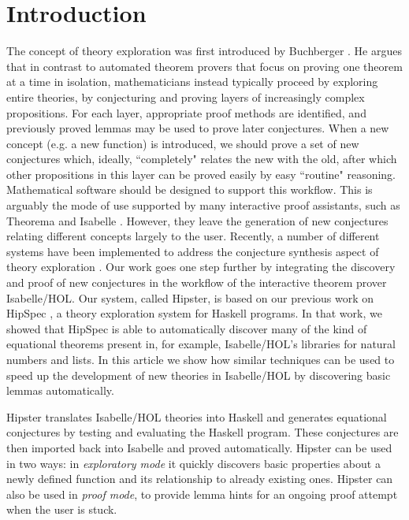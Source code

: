 \section{Introduction}
\label{sec:intro}
The concept of theory exploration was first introduced by Buchberger
\cite{buchberger2000theory}. He argues that in contrast to automated
theorem provers that focus on proving one theorem at a time in
isolation, mathematicians instead typically proceed by exploring
entire theories, by conjecturing and proving layers of increasingly
complex propositions. For each layer, appropriate proof methods are
identified, and previously proved lemmas may be used to prove later
conjectures. When a new concept (e.g. a new function) is introduced,
we should prove a set of new conjectures which, ideally, ``completely"
relates the new with the old, after which other propositions in this
layer can be proved easily by easy ``routine" reasoning. Mathematical
software should be designed to support this workflow. This is arguably
the mode of use supported by many interactive proof assistants, such
as Theorema \cite{theorema} and Isabelle \cite{isabelle}. However,
they leave the generation of new conjectures relating different
concepts largely to the user. Recently, a number of different systems
have been implemented to address the conjecture synthesis aspect of theory exploration
\cite{McCasland2006,isacosy,isascheme,hipspecCADE}. Our work goes one
step further by integrating the discovery and proof of new conjectures
in the workflow of the interactive theorem prover Isabelle/HOL. Our
system, called Hipster, is based on our previous work on HipSpec
\cite{hipspecCADE}, a theory exploration system for Haskell programs.
In that work, we showed that HipSpec is able to
automatically discover many of the kind of equational theorems present
in, for example, Isabelle/HOL's libraries for natural numbers and lists.
In this article we show how similar techniques can be used to speed up the
development of new theories in Isabelle/HOL by discovering basic lemmas
automatically.

Hipster translates Isabelle/HOL theories into Haskell and generates equational conjectures by
testing and evaluating the Haskell program. These conjectures are then
imported back into Isabelle and proved automatically. Hipster can be
used in two ways: in \emph{exploratory mode} it quickly discovers
basic properties about a newly defined function and its relationship
to already existing ones. Hipster can also be used in \emph{proof
  mode}, to provide lemma hints for an ongoing proof attempt when the
user is stuck.

